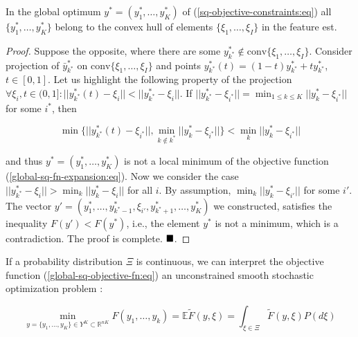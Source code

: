 \begin{lemma}
    \label{Lemma 1} In the global optimum $ y^{*} = (y_1^{*}, \ldots, y_K^{*}) $ of (\ref{sq-objective-constraints:eq}) all $ \{ y_1^{*}, \ldots, y_K^{*} \} $ belong to the convex hull of elements $ \{ \xi_1, \ldots, \xi_I \} $ in the feature est.
\end{lemma}
\begin{proof}
    Suppose the opposite, where there are some $ y_{k^*}^* \notin \text{conv} \{ \xi_1, \ldots, \xi_I \} $. Consider projection of $ \bar{y}_{k^*}^* $ on $ \text{conv} \{ \xi_1, \ldots, \xi_I \} $ and points $ y_{k^*}^* (t) = (1 - t) y_{k^*}^* + t y_{k^*}^* $, $ t \in [0, 1] $. Let us highlight the following property of the projection $ \forall \xi_i, t \in (0, 1]:  || y_{k^*}^* (t) - \xi_i || < || y_{k^*}^* - \xi_i || $. If $ || y_{k^*}^* - \xi_{i^*} || = \min_{1 \leq k \leq K} || y_k^* - \xi_{i^*} || $ for some $ i^* $, then

    \begin{equation}
        \min \{ || y_{k^*}^* (t) - \xi_{i^*} ||, \min_{k \notin k^*} || y_k^* - \xi_{i^*} || \} < \min_k || y_k^* - \xi_{i^*} ||
    \end{equation}

    \noindent and thus $ y^{*} = (y_1^{*}, \ldots, y_K^{*}) $ is not a local minimum of the objective function (\ref{global-sq-fn-expansion:eq}). Now we consider the case $ || y_{k^*}^* - \xi_i || > \min_k || y_k^* - \xi_i || $ for all $ i $. By assumption, $ \min_k || y_k^* - \xi_{i'} || $ for some $ i' $. The vector $ y' = (y_1^{*}, \ldots, y_{k^* - 1}^*, \xi_{i'}, y_{k^* + 1}^*, \ldots, y_K^{*}) $ we constructed, satisfies the inequality $ F(y') < F(y^*) $, i.e., the element $ y^{*} $ is not a minimum, which is a contradiction. The proof is complete. $ \qed $.
\end{proof}

If a probability distribution $ \Xi $ is continuous, we can interpret the objective function (\ref{global-sq-objective-fn:eq}) an unconstrained smooth stochastic optimization problem \cite{ermoliev1976stochastic,Newton_Yousefian_Pasupathy_2018,Norkin_Kozyriev_Norkin_2024}:

\begin{equation}
    \label{smooth-stoch-opt-problem:eq}
        \min_{y = \{ y_1, \ldots, y_K \} \in Y^K \subset \mathbb{R}^{nK}} F(y_1, \ldots, y_k) = \mathbb{E} \tilde{F}(y, \xi) = \int_{\xi \in \Xi} \tilde{F}(y, \xi) P(d \xi)
\end{equation}

